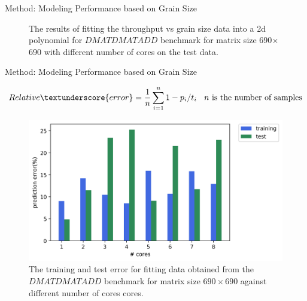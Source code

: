 \documentclass[10pt]{beamer}
\begin{document}
\begin{frame}{Method: Modeling Performance based on Grain Size}
\begin{outline}
\begin{figure}[H]
			
			\caption{The results of fitting the throughput vs grain size data into a 2d polynomial for $DMATDMATADD$ benchmark for matrix size 690$\times$690 with different number of cores on the test data.}
			\label{fig10}
		\end{figure}
	\end{outline}
\end{frame}


\begin{frame}{Method: Modeling Performance based on Grain Size}
	\begin{outline}	
		$$Relative\textunderscore{error} = \frac{1}{n}\sum_{i=1}^{n} {1-p_i/t_i}\:\:\:\: n \text{ is the number of samples}$$
\begin{figure}[H]
	\centering
	\includegraphics[scale=.5]{images/polyfit/fig_train_test_690.png}
	\caption{The training and test error for fitting data obtained from the $DMATDMATADD$ benchmark for matrix size $690\times690$ against different number of cores cores.}	
	\label{fig11}
\end{figure}
	\end{outline}
\end{frame}
\end{document}
